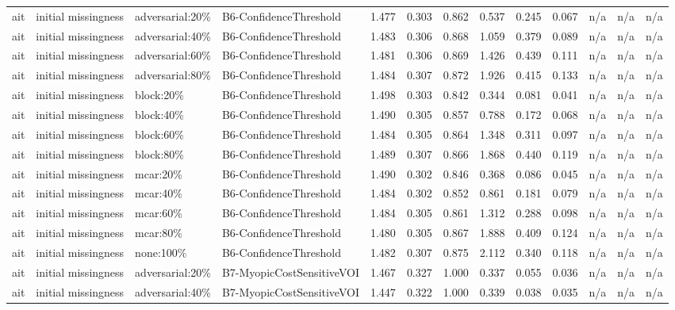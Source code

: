 \begin{table}[!ht]
{\begin{tabular}{lllllllllllll}
ait & initial missingness & adversarial:20\% & B6-ConfidenceThreshold & 1.477 & 0.303 & 0.862 & 0.537 & 0.245 & 0.067 & n/a & n/a & n/a \\
ait & initial missingness & adversarial:40\% & B6-ConfidenceThreshold & 1.483 & 0.306 & 0.868 & 1.059 & 0.379 & 0.089 & n/a & n/a & n/a \\
ait & initial missingness & adversarial:60\% & B6-ConfidenceThreshold & 1.481 & 0.306 & 0.869 & 1.426 & 0.439 & 0.111 & n/a & n/a & n/a \\
ait & initial missingness & adversarial:80\% & B6-ConfidenceThreshold & 1.484 & 0.307 & 0.872 & 1.926 & 0.415 & 0.133 & n/a & n/a & n/a \\
ait & initial missingness & block:20\% & B6-ConfidenceThreshold & 1.498 & 0.303 & 0.842 & 0.344 & 0.081 & 0.041 & n/a & n/a & n/a \\
ait & initial missingness & block:40\% & B6-ConfidenceThreshold & 1.490 & 0.305 & 0.857 & 0.788 & 0.172 & 0.068 & n/a & n/a & n/a \\
ait & initial missingness & block:60\% & B6-ConfidenceThreshold & 1.484 & 0.305 & 0.864 & 1.348 & 0.311 & 0.097 & n/a & n/a & n/a \\
ait & initial missingness & block:80\% & B6-ConfidenceThreshold & 1.489 & 0.307 & 0.866 & 1.868 & 0.440 & 0.119 & n/a & n/a & n/a \\
ait & initial missingness & mcar:20\% & B6-ConfidenceThreshold & 1.490 & 0.302 & 0.846 & 0.368 & 0.086 & 0.045 & n/a & n/a & n/a \\
ait & initial missingness & mcar:40\% & B6-ConfidenceThreshold & 1.484 & 0.302 & 0.852 & 0.861 & 0.181 & 0.079 & n/a & n/a & n/a \\
ait & initial missingness & mcar:60\% & B6-ConfidenceThreshold & 1.484 & 0.305 & 0.861 & 1.312 & 0.288 & 0.098 & n/a & n/a & n/a \\
ait & initial missingness & mcar:80\% & B6-ConfidenceThreshold & 1.480 & 0.305 & 0.867 & 1.888 & 0.409 & 0.124 & n/a & n/a & n/a \\
ait & initial missingness & none:100\% & B6-ConfidenceThreshold & 1.482 & 0.307 & 0.875 & 2.112 & 0.340 & 0.118 & n/a & n/a & n/a \\
ait & initial missingness & adversarial:20\% & B7-MyopicCostSensitiveVOI & 1.467 & 0.327 & 1.000 & 0.337 & 0.055 & 0.036 & n/a & n/a & n/a \\
ait & initial missingness & adversarial:40\% & B7-MyopicCostSensitiveVOI & 1.447 & 0.322 & 1.000 & 0.339 & 0.038 & 0.035 & n/a & n/a & n/a \\

\end{tabular}}
\end{table}
